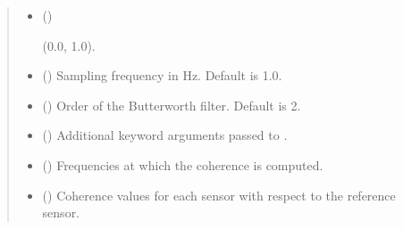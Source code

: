 \documentclass[letterpaper,10pt,english]{sphinxmanual}
\begin{document}
\begin{fulllineitems}
\begin{quote}
\begin{description}
\begin{itemize}
\begin{description}
\end{description}


\item {} 
\sphinxAtStartPar
{} (\sphinxstyleliteralemphasis{\sphinxupquote{, }}) \textendash{} \begin{description}
\sphinxAtStartPar
(0.0, 1.0).

\end{description}


\item {} 
\sphinxAtStartPar
{} (\sphinxstyleliteralemphasis{\sphinxupquote{, }}) \textendash{} Sampling frequency in Hz. Default is 1.0.

\item {} 
\sphinxAtStartPar
{} (\sphinxstyleliteralemphasis{\sphinxupquote{, }}) \textendash{} Order of the Butterworth filter. Default is 2.

\item {} 
\sphinxAtStartPar
{} (\sphinxstyleliteralemphasis{\sphinxupquote{, }}) \textendash{} Additional keyword arguments passed to .

\end{itemize}

\sphinxAtStartPar
\begin{itemize}
\item {} 
\sphinxAtStartPar
{} () \textendash{} Frequencies at which the coherence is computed.

\item {} 
\sphinxAtStartPar
{} () \textendash{} Coherence values for each sensor with respect to the reference sensor.

\end{itemize}


\end{description}\end{quote}

\end{fulllineitems}
\end{document}
